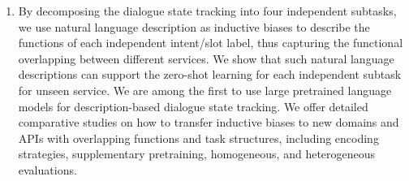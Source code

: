 \begin{enumerate}
  \item By decomposing the dialogue state tracking into four independent
  subtasks, we use natural language description as inductive biases
  to describe the functions of each independent intent/slot label,
  thus capturing the functional overlapping between different
  services. We show that such natural language descriptions can
  support the zero-shot learning for each independent subtask for
  unseen service. We are among the first to use large pretrained
  language models for description-based dialogue state tracking. We
  offer detailed comparative studies on how to transfer inductive
  biases to new domains and APIs with overlapping functions and task
  structures, including encoding strategies, supplementary
  pretraining, homogeneous, and heterogeneous evaluations.
\end{enumerate}


